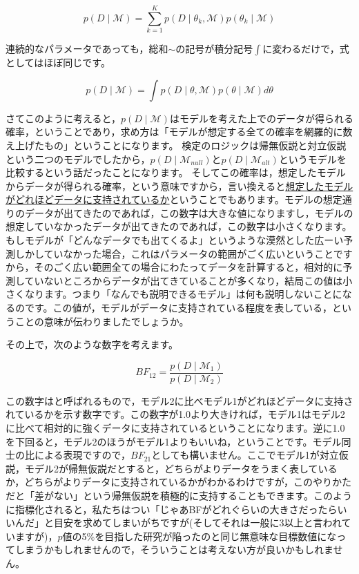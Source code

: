 \documentclass{ltjbook}
\begin{document}
\[ p(D\mid \mathcal{M}) = \sum_{k=1}^K p(D\mid \theta_k,\mathcal{M})p(\theta_k\mid \mathcal{M}) \]

連続的なパラメータであっても，総和$\sim$の記号が積分記号$\int$に変わるだけで，式としてはほぼ同じです。

\[ p(D \mid \mathcal{M}) = \int p(D\mid \theta,\mathcal{M})p(\theta\mid\mathcal{M}) d\theta \]

さてこのように考えると，$p(D \mid \mathcal{M})$はモデルを考えた上でのデータが得られる確率，ということであり，求め方は「モデルが想定する全ての確率を網羅的に数え上げたもの」ということになります。
検定のロジックは帰無仮説と対立仮説という二つのモデルでしたから，$p(D \mid \mathcal{M}_{null})$と$p(D \mid \mathcal{M}_{alt})$というモデルを比較するという話だったことになります。
そしてこの確率は，想定したモデルからデータが得られる確率，という意味ですから，言い換えると\underline{想定したモデルがどれほどデータに支持されているか}ということでもあります。モデルの想定通りのデータが出てきたのであれば，この数字は大きな値になりますし，モデルの想定していなかったデータが出てきたのであれば，この数字は小さくなります。もしモデルが「どんなデータでも出てくるよ」というような漠然とした広ーい予測しかしていなかった場合，これはパラメータの範囲がごく広いということですから，そのごく広い範囲全ての場合にわたってデータを計算すると，相対的に予測していないところからデータが出てきていることが多くなり，結局この値は小さくなります。つまり「なんでも説明できるモデル」は何も説明しないことになるのです。この値が，モデルがデータに支持されている程度を表している，ということの意味が伝わりましたでしょうか。

その上で，次のような数字を考えます。

\[ BF_{12} = \frac{p(D\mid \mathcal{M}_1)}{p(D\mid \mathcal{M}_2)} \]

この数字はと呼ばれるもので，モデル2に比べモデル1がどれほどデータに支持されているかを示す数字です。この数字が1.0より大きければ，モデル1はモデル2に比べて相対的に強くデータに支持されているということになります。逆に1.0を下回ると，モデル2のほうがモデル1よりもいいね，ということです。モデル同士の比による表現ですので，$BF_{21}$としても構いません。ここでモデル1が対立仮説，モデル2が帰無仮説だとすると，どちらがよりデータをうまく表しているか，どちらがよりデータに支持されているかがわかるわけですが，このやりかただと「差がない」という帰無仮説を積極的に支持することもできます。このように指標化されると，私たちはつい「じゃあBFがどれぐらいの大きさだったらいいんだ」と目安を求めてしまいがちですが(そしてそれは一般に3以上と言われていますが)，$p$値の5\%を目指した研究が陥ったのと同じ無意味な目標数値になってしまうかもしれませんので，そういうことは考えない方が良いかもしれません。
\end{document}

